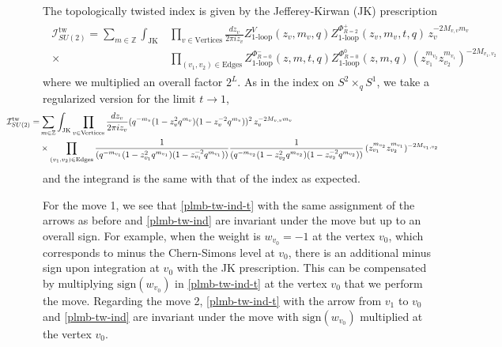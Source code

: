 \documentclass[11pt,hyper,a4paper]{article}
\begin{document}
The topologically twisted index is given by the Jefferey-Kirwan (JK) prescription
\begin{align}
\begin{split}
\mathcal{I}^{\text{tw}}_{SU(2)} = \sum_{m \in \mathbb{Z}} \int_{\text{JK}} &\prod_{v \in \text{Vertices}} \frac{dz_v}{2\pi i z_v} Z_{\text{1-loop}}^{V}(z_v,m_v,q) Z_{\text{1-loop}}^{\Phi_{R=2}^{+}} (z_v,m_v,t, q) \,	 z_v^{-2M_{v,v} m_v}\\
\times & \prod_{(v_1,v_2) \in \text{Edges}} Z_{\text{1-loop}}^{\Phi_{R=0}^{-}}(z,m,t,q) Z_{\text{1-loop}}^{\Phi_{R=0}^{0}}(z,m,q) \,	 (z_{v_1}^{m_{v_2}} z_{v_2}^{m_{v_1}})^{-2M_{v_1,v_2}}	\,	
\end{split}	\label{plmb-tw-ind-t}
\end{align}
where we multiplied an overall factor $2^L$.
As in the index on $S^2 \times_q S^1$, we take a regularized version for the limit $t \rightarrow 1$,
\begin{align}
\begin{split}
\hspace{-15mm}\mathcal{I}^{\text{tw}}_{SU(2)} =& \sum_{m \in \mathbb{Z}} \int_{\text{JK}} \prod_{v \in \text{Vertices}} \frac{dz_v}{2\pi i z_v} (q^{-m_v} (1 - z_v^2 q^{m_v}) (1 - z_v^{-2} q^{m_v}))^2 \,	 z_v^{-2M_{v,v} m_v}\\
\hspace{-10mm}& \times \prod_{(v_1,v_2) \in \text{Edges}}  \frac{1}{(q^{-m_{v_1}} (1 - z_{v_1}^2 q^{m_{v_1}}) (1 - z_{v_1}^{-2} q^{m_{v_1}}))} \frac{1}{(q^{-m_{v_2}} (1 - z_{v_2}^2 q^{m_{v_2}}) (1 - z_{v_2}^{-2} q^{m_{v_2}}))} \,	 (z_{v_1}^{m_{v_2}} z_{v_2}^{m_{v_1}})^{-2M_{v_1,v_2}}	\,	
\end{split}	\label{plmb-tw-ind}
\end{align}
and the integrand is the same with that of the index as expected.


For the move 1, we see that \eqref{plmb-tw-ind-t} with the same assignment of the arrows as before and \eqref{plmb-tw-ind} are invariant under the move but up to an overall sign.
For example, when the weight is $w_{v_0}=-1$ at the vertex $v_0$, which corresponds to minus the Chern-Simons level at $v_0$, there is an additional minus sign upon integration at $v_0$ with the JK prescription.
This can be compensated by multiplying $\text{sign}(w_{v_0})$ in \eqref{plmb-tw-ind-t} at the vertex $v_0$ that we perform the move.
Regarding the move 2, \eqref{plmb-tw-ind-t} with the arrow from $v_1$ to $v_0$ and \eqref{plmb-tw-ind} are invariant under the move with $\text{sign}(w_{v_0})$ multiplied at the vertex $v_0$.
\end{document}
